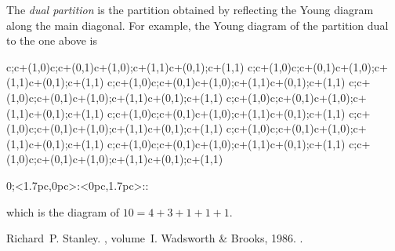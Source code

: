 \documentclass[12pt]{article}
\makeatletter
\def\drawsqlat{%
\begin{xy}{
  0;<1.7pc,0pc>:<0pc,1.7pc>::
  \xylattice{0}{6}{0}{6}}
\end{xy}}
\def\drawsq{\ar@{-}c;c+(1,0)\ar@{-}c;c+(0,1)\ar@{-}c+(1,0);c+(1,1)\ar@{-}c+(0,1);c+(1,1)}
\makeatother
\begin{document}
The \emph{dual partition} is the partition obtained by reflecting
the Young diagram along the main diagonal. For example, the Young
diagram of the partition dual to the one above is
\begin{center}
\begin{renewcommand}{\latticebody}{
\ifnum{} \ifnum{} \drawsq\fi\fi
\ifnum{} \ifnum{} \drawsq\fi\fi
\ifnum{} \ifnum{} \drawsq\fi\fi
\ifnum{} \ifnum{} \drawsq\fi\fi
\ifnum{} \ifnum{} \drawsq\fi\fi
\ifnum{} \ifnum{} \drawsq\fi\fi
\ifnum{} \ifnum{} \drawsq\fi\fi
\ifnum{} \ifnum{} \drawsq\fi\fi
\ifnum{} \ifnum{} \drawsq\fi\fi
\ifnum{} \ifnum{} \drawsq\fi\fi }
\drawsqlat
\end{renewcommand}
\end{center}
which is the diagram of $10=4+3+1+1+1$.

\begin{thebibliography}{1}

Richard~P. Stanley.
, volume~I.
\newblock Wadsworth \& Brooks, 1986.
\newblock {}.

\end{thebibliography}
\end{document}
